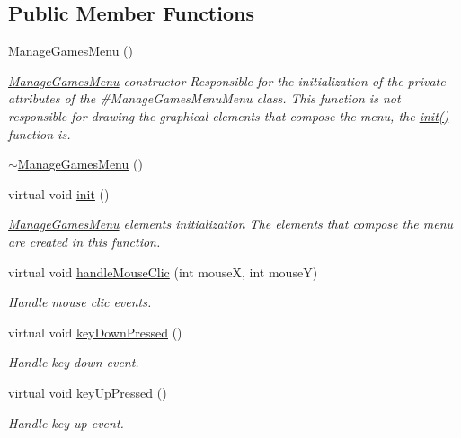 \subsection*{Public Member Functions}
\begin{DoxyCompactItemize}
\item 
\hyperlink{class_symp_1_1_manage_games_menu_a67b463e96bf9c5716f349573860ae0cb}{Manage\-Games\-Menu} ()
\begin{DoxyCompactList}\small\item\em \hyperlink{class_symp_1_1_manage_games_menu}{Manage\-Games\-Menu} constructor Responsible for the initialization of the private attributes of the \#\-Manage\-Games\-Menu\-Menu class. This function is not responsible for drawing the graphical elements that compose the menu, the \hyperlink{class_symp_1_1_manage_games_menu_a2cac1836c3c7272633a99beb0287f9b1}{init()} function is. \end{DoxyCompactList}\item 
\hyperlink{class_symp_1_1_manage_games_menu_aa12c9e144cc1421ad6fefa7c4c140530}{$\sim$\-Manage\-Games\-Menu} ()
\item 
virtual void \hyperlink{class_symp_1_1_manage_games_menu_a2cac1836c3c7272633a99beb0287f9b1}{init} ()
\begin{DoxyCompactList}\small\item\em \hyperlink{class_symp_1_1_manage_games_menu}{Manage\-Games\-Menu} elements initialization The elements that compose the menu are created in this function. \end{DoxyCompactList}\item 
virtual void \hyperlink{class_symp_1_1_manage_games_menu_acbca4c010ddb4a39fcdc1b0e3716bb03}{handle\-Mouse\-Clic} (int mouse\-X, int mouse\-Y)
\begin{DoxyCompactList}\small\item\em Handle mouse clic events. \end{DoxyCompactList}\item 
virtual void \hyperlink{class_symp_1_1_manage_games_menu_ab330c9d8b0103d7232dc698e01d8e820}{key\-Down\-Pressed} ()
\begin{DoxyCompactList}\small\item\em Handle key down event. \end{DoxyCompactList}\item 
virtual void \hyperlink{class_symp_1_1_manage_games_menu_a31141c164d9d36c51eb1a0b5803f0974}{key\-Up\-Pressed} ()
\begin{DoxyCompactList}\small\item\em Handle key up event. \end{DoxyCompactList}\item 

\end{DoxyCompactItemize}
